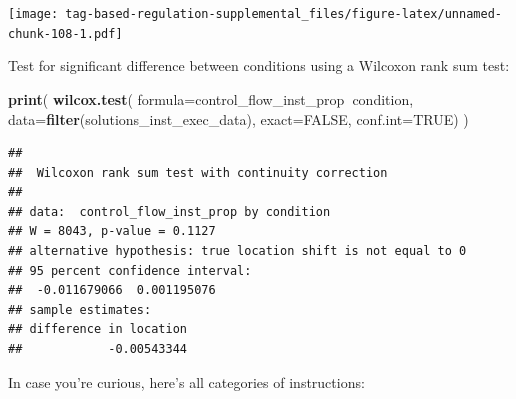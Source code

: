 \documentclass[]{book}
\newenvironment{Shaded}{\begin{snugshade}}{\end{snugshade}}
\newcommand{\DataTypeTok}[1]{\textcolor[rgb]{0.13,0.29,0.53}{#1}}
\newcommand{\KeywordTok}[1]{\textcolor[rgb]{0.13,0.29,0.53}{\textbf{#1}}}
\newcommand{\NormalTok}[1]{#1}
\newcommand{\OperatorTok}[1]{\textcolor[rgb]{0.81,0.36,0.00}{\textbf{#1}}}
\newcommand{\OtherTok}[1]{\textcolor[rgb]{0.56,0.35,0.01}{#1}}
\begin{document}
\texttt{[image: tag-based-regulation-supplemental\_files/figure-latex/unnamed-chunk-108-1.pdf]}

Test for significant difference between conditions using a Wilcoxon rank sum test:

\begin{Shaded}
\begin{Highlighting}[]
\KeywordTok{print}\NormalTok{(}
  \KeywordTok{wilcox.test}\NormalTok{(}
    \DataTypeTok{formula=}\NormalTok{control_flow_inst_prop}\OperatorTok{~}\NormalTok{condition,}
    \DataTypeTok{data=}\KeywordTok{filter}\NormalTok{(solutions_inst_exec_data),}
    \DataTypeTok{exact=}\OtherTok{FALSE}\NormalTok{,}
    \DataTypeTok{conf.int=}\OtherTok{TRUE}\NormalTok{)}
\NormalTok{)}
\end{Highlighting}
\end{Shaded}

\begin{verbatim}
## 
##  Wilcoxon rank sum test with continuity correction
## 
## data:  control_flow_inst_prop by condition
## W = 8043, p-value = 0.1127
## alternative hypothesis: true location shift is not equal to 0
## 95 percent confidence interval:
##  -0.011679066  0.001195076
## sample estimates:
## difference in location 
##            -0.00543344
\end{verbatim}

In case you're curious, here's all categories of instructions:
\end{document}
